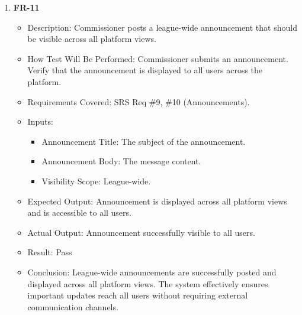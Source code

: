 \documentclass[12pt, titlepage]{article}
\begin{document}
\begin{enumerate}
      \item \textbf{FR-11}  
      \begin{itemize}
          \item Description: Commissioner posts a league-wide announcement that should be visible across all platform views.
          \item How Test Will Be Performed: Commissioner submits an announcement. Verify that the announcement is displayed to all users across the platform.
          \item Requirements Covered: SRS Req \#9, \#10 (Announcements).
          \item Inputs:  
              \begin{itemize}
                  \item Announcement Title: The subject of the announcement.
                  \item Announcement Body: The message content.
                  \item Visibility Scope: League-wide.
              \end{itemize}
          \item Expected Output: Announcement is displayed across all platform views and is accessible to all users.
          \item Actual Output: Announcement successfully visible to all users.
          \item Result: Pass
          \item Conclusion: League-wide announcements are successfully posted and displayed across all platform views.
		  The system effectively ensures important updates reach all users without requiring external communication channels.
      \end{itemize}
\end{enumerate}
\end{document}
